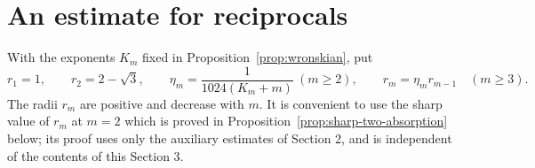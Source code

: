 \documentclass[12pt,letterpaper,reqno]{amsart}
\theoremstyle{definition}
\numberwithin{equation}{section}
\begin{document}
	\section{An estimate for reciprocals}\label{sec:absorption}
	
	With the exponents $K_m$ fixed in Proposition~\ref{prop:wronskian}, put
	\begin{equation}\label{eq:recursive-radii}
		r_1=1,\qquad r_2=2-\sqrt3,\qquad
		\eta_m=\frac1{1024(K_m+m)}\ (m\ge2),\qquad
		r_m=\eta_m r_{m-1}\quad(m\ge3).
	\end{equation}
	The radii $r_m$ are positive and decrease with $m$. It is convenient
	to use the sharp value of $r_m$
	at $m=2$ which is proved in Proposition~\ref{prop:sharp-two-absorption} below;
	its proof uses only the auxiliary estimates of Section 2,
	and is independent of the contents of this Section 3. 
	
\end{document}
